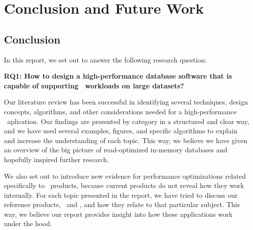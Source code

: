 \chapter{Conclusion and Future Work}
\label{chap:Conclusion and Future Work}
\section{Conclusion}
\label{sec:Conclusion}
In this report, we set out to answer the following research question:

\textbf{RQ1: How to design a high-performance database software that is capable of supporting \bd~workloads on large datasets?} 

Our literature review has been successful in identifying several techniques, design concepts, algorithms, and other considerations needed for a high-performance \bd~aplication. Our findings are presented by category in a structured and clear way, and we have used several examples, figures, and specific algorithms to explain and increase the understanding of each topic. This way, we believe we have given an overview of the big picture of read-optimized in-memory databases and hopefully inspired further research.

We also set out to introduce new evidence for performance optimizations related specifically to \bd~products, because current products do not reveal how they work internally. For each topic presented in the report, we have tried to discuss our reference products, \qlikview~and \tableau, and how they relate to that particular subject. This way, we believe our report provides insight into how these applications work under the hood.

